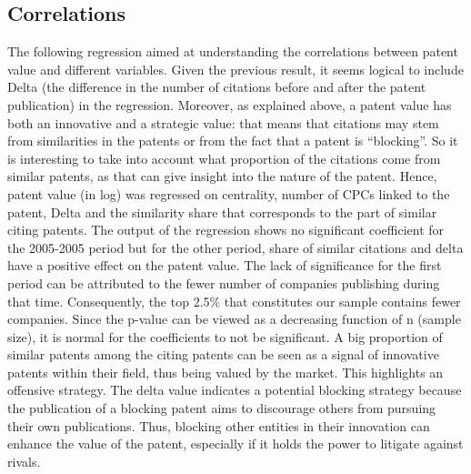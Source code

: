 \documentclass[12pt]{article}
\begin{document}
\subsection{Correlations}
The following regression aimed at understanding the correlations between patent value and different variables. Given the previous result, it seems logical to include Delta (the difference in the number of citations before and after the patent publication) in the regression. Moreover, as explained above, a patent value has both an innovative and a strategic value: that means that citations may stem from similarities in the patents or from the fact that a patent is “blocking”. So it is interesting to take into account what proportion of the citations come from similar patents, as that can give insight into the nature of the patent. Hence, patent value (in log) was regressed on centrality, number of CPCs linked to the patent, Delta and the similarity share that corresponds to the part of similar citing patents. The output of the regression shows no significant coefficient for the 2005-2005 period but for the other period, share of similar citations and delta have a positive effect on the patent value. 
The lack of significance for the first period can be attributed to the fewer number of companies publishing during that time. Consequently, the top 2.5\% that constitutes our sample contains fewer companies. Since the p-value can be viewed as a decreasing function of n (sample size), it is normal for the coefficients to not be significant. A big proportion of similar patents among the citing patents can be seen as a signal of innovative patents within their field, thus being valued by the market. This highlights an offensive strategy. The delta value indicates a potential blocking strategy because the publication of a blocking patent aims to discourage others from pursuing their own publications. Thus, blocking other entities in their innovation can enhance the value of the patent, especially if it holds the power to litigate against rivals.
\end{document}
